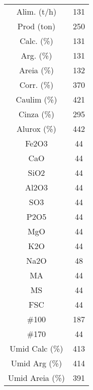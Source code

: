 \newpage
{}
\begin{center}
\begin{tabular}{ c c }
Alim. (t/h)       & 131\\
Prod (ton)        & 250\\
Calc. (\%)        & 131\\
Arg. (\%)         & 131\\
Areia (\%)        & 132\\
Corr. (\%)        & 370\\
Caulim (\%)       & 421\\
Cinza (\%)        & 295\\
Alurox (\%)       & 442\\
Fe2O3             & 44\\
CaO               & 44\\
SiO2              & 44\\
Al2O3             & 44\\
SO3               & 44\\
P2O5              & 44\\
MgO              &  44\\
K2O              &  44\\
Na2O             &  48\\
MA               &  44\\
MS               &  44\\
FSC              &  44\\
\#100             & 187\\
\#170             &  44\\
Umid Calc (\%)   &  413\\
Umid Arg (\%)    &  414 \\
Umid Areia (\%) &    391 \\
\end{tabular}
\end{center}

